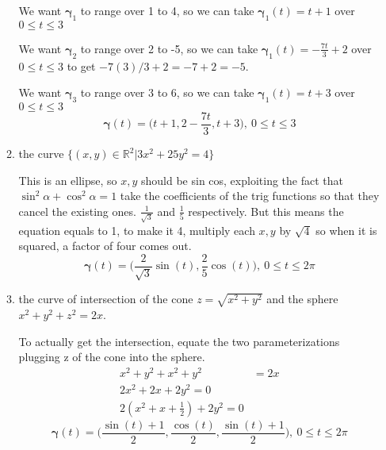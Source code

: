 \documentclass{article}
\begin{document}
\begin{enumerate}
\begin{enumerate}
        We want $\boldsymbol{\gamma}_1$ to range over 1 to 4, so we can take $\boldsymbol{\gamma}_1(t)= t+1$ over $0\leq t \leq 3$

        We want $\boldsymbol{\gamma}_2$ to range over 2 to -5, so we can take $\boldsymbol{\gamma}_1(t)= -\frac{7t}{3}+2$ over $0\leq t \leq 3$ to get $-7(3)/3 + 2 = -7 + 2 = -5$.

        We want $\boldsymbol{\gamma}_3$ to range over 3 to 6, so we can take $\boldsymbol{\gamma}_1(t)= t+3$ over $0\leq t \leq 3$
        \[ \boldsymbol{\gamma}(t) = \Big(t+1,2-\frac{7t}{3}, t+3 \Big),\: 0 \leq t \leq 3 \]
    \item the curve $\{(x,y)\in \mathbb{R}^2|3x^2+25y^2=4\}$
    
    This is an ellipse, so $x,y$ should be sin cos, exploiting the fact that $\sin^2 \alpha + \cos^2 \alpha = 1$ take the coefficients of the trig functions so that they cancel the existing ones. $\frac{1}{\sqrt{3}}$ and $\frac{1}{5}$ respectively. But this means the equation equals to 1, to make it 4, multiply each $x,y$ by $\sqrt{4}$ so when it is squared, a factor of four comes out.
        \[ \boldsymbol{\gamma}(t) = \Big(\frac{2}{\sqrt{3}} \sin(t), \frac{2}{5}\cos(t)\Big), \: 0 \leq t \leq 2\pi \]
    \item the curve of intersection of the cone $z=\sqrt{x^2 + y^2}$ and the sphere $x^2+y^2+z^2 = 2x$.
        
        To actually get the intersection, equate the two parameterizations plugging z of the cone into the sphere.
        \begin{align*}
            x^2 + y^2 + x^2 + y^2 &= 2x \\
            2x^2 + 2x +2y^2 = 0 \\
            2(x^2 + x + \frac{1}{2}) +2y^2 = 0
        \end{align*}
        \[ \boldsymbol{\gamma}(t) = \Big( \frac{\sin(t) + 1}{2}, \frac{\cos(t)}{2}, \frac{\sin(t) + 1}{2} \Big), \: 0 \leq t \leq 2\pi \]
\end{enumerate}


\end{enumerate}
\end{document}
